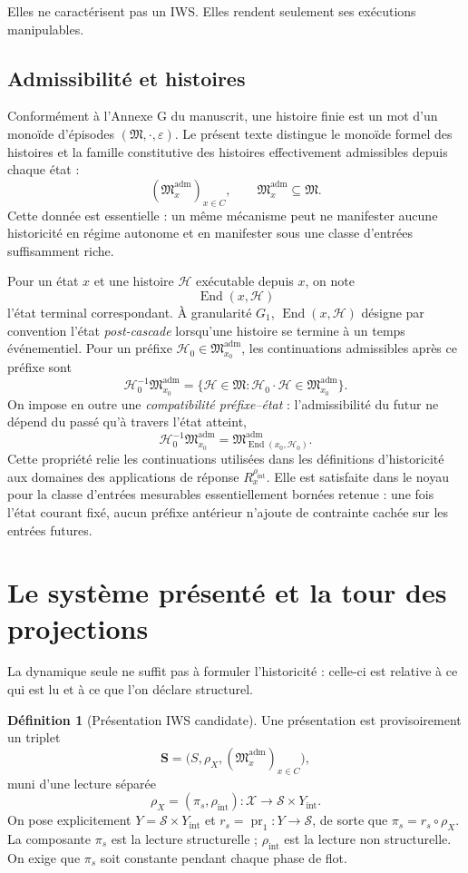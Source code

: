 \documentclass[11pt,a4paper]{article}
\theoremstyle{definition}
\newtheorem{definition}{Définition}[section]
\theoremstyle{remark}
\newcommand{\X}{\mathcal X}
\newcommand{\Sstruct}{\mathcal S}
\newcommand{\M}{\mathfrak M}
\newcommand{\Madm}{\mathfrak M^{\mathrm{adm}}}
\newcommand{\End}{\operatorname{End}}
\begin{document}
Elles ne caractérisent pas un IWS. Elles rendent seulement ses exécutions manipulables.

\subsection{Admissibilité et histoires}

Conformément à l'Annexe G du manuscrit, une histoire finie est un mot d'un monoïde d'épisodes $(\M,\cdot,\varepsilon)$. Le présent texte distingue le monoïde formel des histoires et la famille constitutive des histoires effectivement admissibles depuis chaque état :
\[
\boxed{(\Madm_x)_{x\in C},\qquad \Madm_x\subseteq\M.}
\]
Cette donnée est essentielle : un même mécanisme peut ne manifester aucune historicité en régime autonome et en manifester sous une classe d'entrées suffisamment riche.

Pour un état $x$ et une histoire $\mathcal H$ exécutable depuis $x$, on note
\[
\End(x,\mathcal H)
\]
l'état terminal correspondant. À granularité $G_1$, $\End(x,\mathcal H)$ désigne par convention l'état \emph{post-cascade} lorsqu'une histoire se termine à un temps événementiel. Pour un préfixe $\mathcal H_0\in\Madm_{x_0}$, les continuations admissibles après ce préfixe sont
\[
\mathcal H_0^{-1}\Madm_{x_0}
=
\{\mathcal H\in\M:\mathcal H_0\cdot\mathcal H\in\Madm_{x_0}\}.
\]
On impose en outre une \emph{compatibilité préfixe--état} : l'admissibilité du futur ne dépend du passé qu'à travers l'état atteint,
\[
\boxed{
\mathcal H_0^{-1}\Madm_{x_0}
=
\Madm_{\End(x_0,\mathcal H_0)}.}
\]
Cette propriété relie les continuations utilisées dans les définitions d'historicité aux domaines des applications de réponse $R_x^{\rho_{\mathrm{int}}}$. Elle est satisfaite dans le noyau pour la classe d'entrées mesurables essentiellement bornées retenue : une fois l'état courant fixé, aucun préfixe antérieur n'ajoute de contrainte cachée sur les entrées futures. 
\section{Le système présenté et la tour des projections}

La dynamique seule ne suffit pas à formuler l'historicité : celle-ci est relative à ce qui est lu et à ce que l'on déclare structurel.

\begin{definition}[Présentation IWS candidate]
Une présentation est provisoirement un triplet
\[
\mathbf S=\bigl(S,\rho_X,(\Madm_x)_{x\in C}\bigr),
\]
muni d'une lecture séparée
\[
\boxed{\rho_X=(\pi_s,\rho_{\mathrm{int}}):\X\longrightarrow \Sstruct\times Y_{\mathrm{int}}.}
\]
On pose explicitement $Y=\Sstruct\times Y_{\mathrm{int}}$ et $r_s=\operatorname{pr}_1:Y\to\Sstruct$, de sorte que $\pi_s=r_s\circ\rho_X$. La composante $\pi_s$ est la lecture structurelle ; $\rho_{\mathrm{int}}$ est la lecture non structurelle. On exige que $\pi_s$ soit constante pendant chaque phase de flot.
\end{definition}
\end{document}
